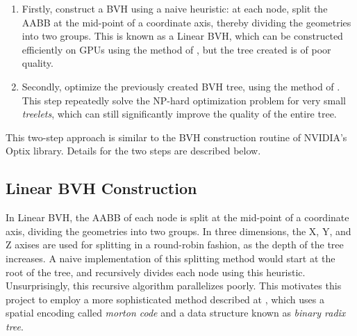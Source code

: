 \begin{enumerate}
    \item Firstly, construct a BVH using a naive heuristic: at each node, split the AABB at the mid-point of a coordinate axis, thereby dividing the geometries into two groups. This is known as a Linear BVH, which can be constructed efficiently on GPUs using the method of \cite{bvh_build}, but the tree created is of poor quality.
    \item Secondly, optimize the previously created BVH tree, using the method of \cite{bvh_optimize}. This step repeatedly solve the NP-hard optimization problem for very small \textit{treelets}, which can still significantly improve the quality of the entire tree.
\end{enumerate}
This two-step approach is similar to the BVH construction routine of NVIDIA's Optix library. Details for the two steps are described below.

\subsection{Linear BVH Construction}
In Linear BVH, the AABB of each node is split at the mid-point of a coordinate axis, dividing the geometries into two groups. In three dimensions, the X, Y, and Z axises are used for splitting in a round-robin fashion, as the depth of the tree increases. A naive implementation of this splitting method would start at the root of the tree, and recursively divides each node using this heuristic. Unsurprisingly, this recursive algorithm parallelizes poorly. This motivates this project to employ a more sophisticated method described at \cite{bvh_build}, which uses a spatial encoding called \textit{morton code} and a data structure known as \textit{binary radix tree}.

